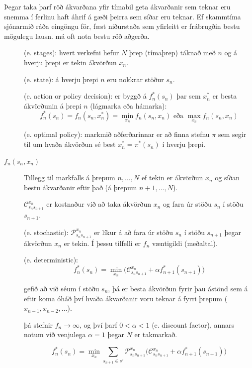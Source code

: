 Þegar taka þarf röð ákvarðana  yfir tímabil geta ákvarðanir sem teknar eru snemma í ferlinu haft áhrif á gæði þeirra sem síðar eru teknar. Ef skammtíma sjónarmið ráða eingöngu för, fæst niðurstaða sem yfirleitt er frábrugðin bestu mögulegu lausn.  má oft nota bestu röð aðgerða.

\begin{description}
\item[] (e. stages): hvert verkefni hefur $N$ þrep (tímaþrep) táknað með $n$ og á hverju þrepi er tekin ákvörðun $x_n$.
\item[] (e. state): á hverju þrepi $n$ eru nokkrar stöður $s_n$.
\item[] (e. action or policy decision): er byggð á $f_{n}^*(s_{n})$ þar sem $x^*_n$ er besta ákvörðunin á þrepi $n$ (lágmarka eða hámarka):
  $$f_n^*(s_n) = f_n(s_n,x_n^*) = \min_{x_n} f_n(s_n,x_n) \mbox{ eða } \max_{x_n} f_n(s_n,x_n)$$
\item[] (e. optimal policy): markmið aðferðarinnar er að finna stefnu $\pi$ sem segir til um hvaða ákvörðun sé best $x^*_n = \pi^*(s_n)$ í hverju þrepi.
\item[\emph{$f_n(s_n,x_n)$}]  Tillegg til markfalls á þrepum $n,\ldots, N$ ef tekin er ákvörðun $x_n$ og síðan bestu ákvarðanir eftir það (á þrepum $n+1, \ldots, N$).
\item[] $\mathcal{C}_{s_ns_{n+1}}^{x_n}$ er kostnaður við að taka ákvörðun $x_n$ og fara úr stöðu $s_n$ í stöðu $s_{n+1}$.
\item[] (e. stochastic): $\mathcal{P}_{s_ns_{n+1}}^{x_n}$ er líkur á að fara úr stöðu $s_n$ í stöðu $s_{n+1}$ þegar ákvörðun $x_n$ er tekin. Í þessu   tilfelli er $f_n$ væntigildi (meðaltal).
\item[] (e. deterministic):
$$f_n^*(s_n) = \min_{x_n} \Big(\mathcal{C}_{s_ns_{n+1}}^{x_n}+ \alpha f_{n+1}^*(s_{n+1})\Big)$$
\item[] gefið að við séum í stöðu $s_n$, þá er besta ákvörðun fyrir þau ástönd sem á eftir koma óháð því hvaða ákvarðanir voru teknar á fyrri þrepum   ($x_{n-1}, x_{n-2}, \ldots$).
\item[] þá stefnir $f_n\rightarrow\infty$, og því þarf $0 < \alpha <1$ (e. discount factor), annars notum við venjulega $\alpha=1$ þegar $N$ er takmarkað.
\item[]
$$f_n^*(s_n) = \min_{x_n} \sum_{s_{n+1}\in
  s'}\mathcal{P}_{s_ns_{n+1}}^{x_n}\Big(\mathcal{C}_{s_ns_{n+1}}^{x_n}+ \alpha f_{n+1}^*(s_{n+1})\Big)$$
\end{description}
